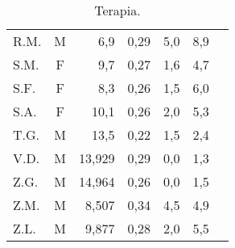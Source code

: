 \begin{table}[!h]
\begin{center}
\begin{tabular}{lcrcccl}
R.M.	& M & 6,9   	      &  0,29     	& 5,0                 & 8,9  \\
S.M.	& F & 9,7   	      &  0,27     	& 1,6              & 4,7  \\
S.F.	& F & 8,3   	      &  0,26     	& 1,5              & 6,0  \\
S.A.	& F & 10,1  	      &  0,26     	& 2,0                 & 5,3  \\
T.G.    & M & 13,5            &  0,22       & 1,5              & 2,4  \\
V.D.	& M & 13,929  	      &  0,29     	& 0,0                 & 1,3  \\
Z.G.	& M & 14,964  	      &  0,26     	& 0,0                & 1,5  \\
Z.M.	& M & 8,507   	      &  0,34     	& 4,5                & 4,9  \\
Z.L.	& M & 9,877   	      &  0,28     	& 2,0             & 5,5  \\
\bottomrule
\end{tabular}
\end{center}
\caption{Terapia.}
\label{tab:Terapia}
\end{table}


